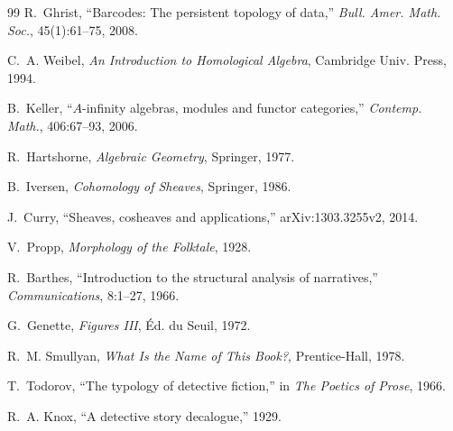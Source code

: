 \documentclass[12pt,twocolumn]{ltjsarticle}
\begin{document}
\begin{thebibliography}{99}
R.~Ghrist,
``Barcodes: The persistent topology of data,''
\textit{Bull. Amer. Math. Soc.},
45(1):61--75, 2008.

C.~A. Weibel,
\textit{An Introduction to Homological Algebra},
Cambridge Univ. Press, 1994.

B.~Keller,
``$A$-infinity algebras, modules and functor categories,''
\textit{Contemp. Math.}, 406:67--93, 2006.

R.~Hartshorne,
\textit{Algebraic Geometry},
Springer, 1977.

B.~Iversen,
\textit{Cohomology of Sheaves},
Springer, 1986.

J.~Curry,
``Sheaves, cosheaves and applications,''
arXiv:1303.3255v2, 2014.

V.~Propp,
\textit{Morphology of the Folktale},
1928.

R.~Barthes,
``Introduction to the structural analysis of narratives,''
\textit{Communications}, 8:1--27, 1966.

G.~Genette,
\textit{Figures III},
\'{E}d. du Seuil, 1972.

R.~M. Smullyan,
\textit{What Is the Name of This Book?},
Prentice-Hall, 1978.

T.~Todorov,
``The typology of detective fiction,''
in \textit{The Poetics of Prose}, 1966.

R.~A. Knox,
``A detective story decalogue,''
1929.

\end{thebibliography}
\end{document}

